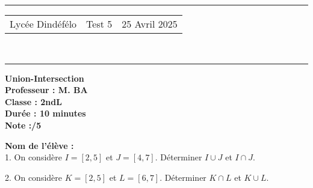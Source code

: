 \documentclass[a4paper,12pt]{article}
\begin{document}
\hrule %
\begin{center}
    \begin{tabular}{@{} p{5cm} p{5cm} p{5cm} @{}} %
        Lycée Dindéfélo & \quad\quad\quad Test 5 & 25 Avril 2025 \\
    \end{tabular}
    \\[-0.01cm] %
    \hrule %
\end{center}
\begin{center}
    \textbf{\Large Union-Intersection} \\[0.2cm]
    \textbf{\large Professeur : M. BA} \\[0.2cm]
    \textbf{Classe : 2ndL} \\[0.2cm]
    \textbf{\small Durée : 10 minutes} \\[0.2cm]
    \textbf{\small Note :\quad\quad\quad /5}
\end{center}

\textbf{\small Nom de l'élève :} \underline{\hspace{8cm}} \\[0.5cm] 
 
1. On considère \( I = [2, 5] \) et \( J = [4, 7] \). Déterminer \( I \cup J \) et \( I \cap J \).  

\newpage

\vspace*{1cm} %
2. On considère \( K = [2, 5] \) et \( L = [6, 7] \). Déterminer \( K \cap L \) et \( K \cup L \).  
\end{document}
